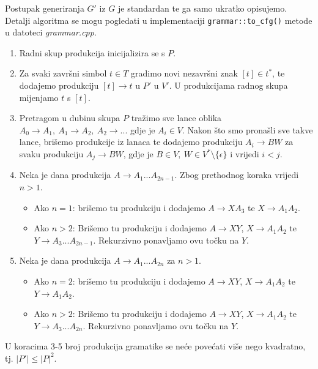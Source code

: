 \documentclass[a4paper,oneside,12pt]{article} %
\begin{document}
    Postupak generiranja $G'$ iz $G$ je standardan te ga samo ukratko opisujemo.
    Detalji algoritma se mogu pogledati u implementaciji \verb|grammar::to_cfg()| metode
        u datoteci \emph{grammar.cpp}.
    \begin{enumerate}
        \item Radni skup produkcija inicijalizira se s $P$.
        \item Za svaki završni simbol $t \in T$ gradimo novi nezavršni znak $[t] \in t^*$,
            te dodajemo produkciju $[t] \to t$ u $P'$ u $V'$.
            U produkcijama radnog skupa mijenjamo $t$ s $[t]$.
        \item Pretragom u dubinu skupa $P$ 
            tražimo sve lance oblika $A_0 \to A_1,\ A_1 \to A_2,\ A_2 \to ...$ gdje je $A_i \in V$.
            Nakon što smo pronašli sve takve lance,
                brišemo produkcije iz lanaca te 
                dodajemo produkciju $A_i \to BW$ za svaku produkciju $A_j \to BW$,
                gdje je $B \in V,\ W \in V^* \setminus \{ \epsilon \} $
                i vrijedi $i < j$.
        \item Neka je dana produkcija $A \to A_1...A_{2n - 1}$.
            Zbog prethodnog koraka vrijedi $n > 1$. 
            \begin{itemize}
                \item Ako $n = 1$:
                    brišemo tu produkciju i dodajemo $A \to XA_3$ te
                    $X \to A_1A_2$.
                \item Ako $n > 2$:
                Brišemo tu produkciju i dodajemo $A \to XY$,
                    $X \to A_1A_2$ te $Y \to A_3...A_{2n-1}$.
                Rekurzivno ponavljamo ovu točku na $Y$.
            \end{itemize}
        \item Neka je dana produkcija $A \to A_1...A_{2n}$ za $n > 1$.
        \begin{itemize}
            \item Ako $n = 2$:
            brišemo tu produkciju i dodajemo $A \to XY$,
            $X \to A_1A_2$ te $Y \to A_1A_2$.
            \item Ako $n > 2$:
            Brišemo tu produkciju i dodajemo $A \to XY$,
            $X \to A_1A_2$ te $Y \to A_3...A_{2n}$.
            Rekurzivno ponavljamo ovu točku na $Y$.
        \end{itemize}
    \end{enumerate}
   
    U koracima 3-5 broj produkcija gramatike se neće povećati više nego kvadratno,
        tj. $|P'| \leq |P|^2$.
        
\end{document}
